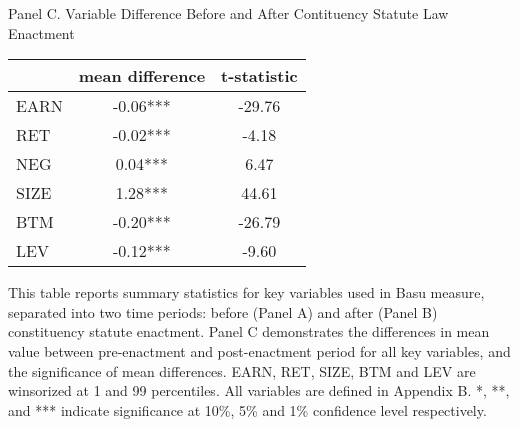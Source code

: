 \begin{table}[H]
\begin{tabular}{lrrrrrrrrr}
		\bottomrule
		\bottomrule
	\end{tabular}%
	\bigbreak
	Panel C. Variable Difference Before and After Contituency Statute Law Enactment
	\begin{tabular}{lcc}
		\toprule
		\toprule
		& \multicolumn{1}{l}{mean difference} & \multicolumn{1}{l}{t-statistic} \\
		\midrule
		EARN  & -0.06*** & -29.76 \\
		RET   & -0.02*** & -4.18 \\
		NEG   & 0.04*** & 6.47 \\
		SIZE  & 1.28*** & 44.61 \\
		BTM   & -0.20*** & -26.79 \\
		LEV   & -0.12*** & -9.60 \\
		\bottomrule
		\bottomrule
	\end{tabular}%
\end{table}%
\noindent This table reports summary statistics for key variables used in Basu measure, separated into two time periods: before (Panel A) and after (Panel B) constituency statute enactment. Panel C demonstrates the differences in mean value between pre-enactment and post-enactment period for all key variables, and the significance of mean differences. EARN, RET, SIZE, BTM and LEV are winsorized at 1 and 99 percentiles. All variables are defined in Appendix B. *, **, and *** indicate significance at 10\%, 5\% and 1\% confidence level respectively.

